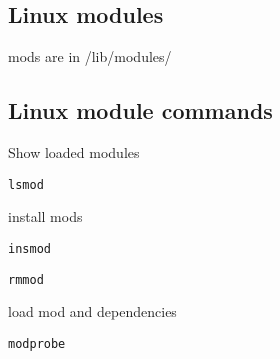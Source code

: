 
\subsection{Linux modules}
mods are in /lib/modules/

\subsection{Linux module commands}

Show loaded modules
\begin{verbatim}
lsmod
\end{verbatim}

install mods

\begin{verbatim}
insmod
\end{verbatim}

\begin{verbatim}
rmmod
\end{verbatim}

load mod and dependencies
\begin{verbatim}
modprobe
\end{verbatim}

